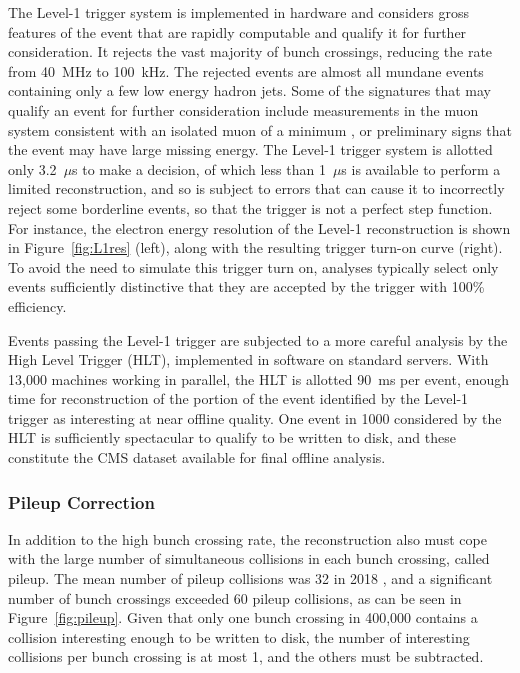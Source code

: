     The Level-1 trigger system is implemented in hardware and considers gross features of the event that are rapidly computable and qualify it for further consideration.
    It rejects the vast majority of bunch crossings, reducing the rate from 40~MHz to 100~kHz.
    The rejected events are almost all mundane events containing only a few low energy hadron jets.
    Some of the signatures that may qualify an event for further consideration include measurements in the muon system consistent with an isolated muon of a minimum \pt, or preliminary signs that the event may have large missing energy.
    The Level-1 trigger system is allotted only 3.2~$\mu$s to make a decision, of which less than 1~$\mu$s is available to perform a limited reconstruction, and so is subject to errors that can cause it to incorrectly reject some borderline events, so that the trigger is not a perfect step function.
    For instance, the electron energy resolution of the Level-1 reconstruction is shown in Figure~\ref{fig:L1res} (left), along with the resulting trigger turn-on curve (right).
    To avoid the need to simulate this trigger turn on, analyses typically select only events sufficiently distinctive that they are accepted by the trigger with 100\% efficiency.

    Events passing the Level-1 trigger are subjected to a more careful analysis by the High Level Trigger (HLT), implemented in software on standard servers.
    With 13,000 machines working in parallel, the HLT is allotted 90~ms per event, enough time for reconstruction of the portion of the event identified by the Level-1 trigger as interesting at near offline quality.
    One event in 1000 considered by the HLT is sufficiently spectacular to qualify to be written to disk, and these constitute the CMS dataset available for final offline analysis.

    \subsubsection{Pileup Correction} \label{sec:pileup}

    In addition to the high bunch crossing rate, the reconstruction also must cope with the large number of simultaneous collisions in each bunch crossing, called pileup.
    The mean number of pileup collisions was 32 in 2018 \cite{lumipublic}, and a significant number of bunch crossings exceeded 60 pileup collisions, as can be seen in Figure~\ref{fig:pileup}.
    Given that only one bunch crossing in 400,000 contains a collision interesting enough to be written to disk, the number of interesting collisions per bunch crossing is at most 1, and the others must be subtracted.

